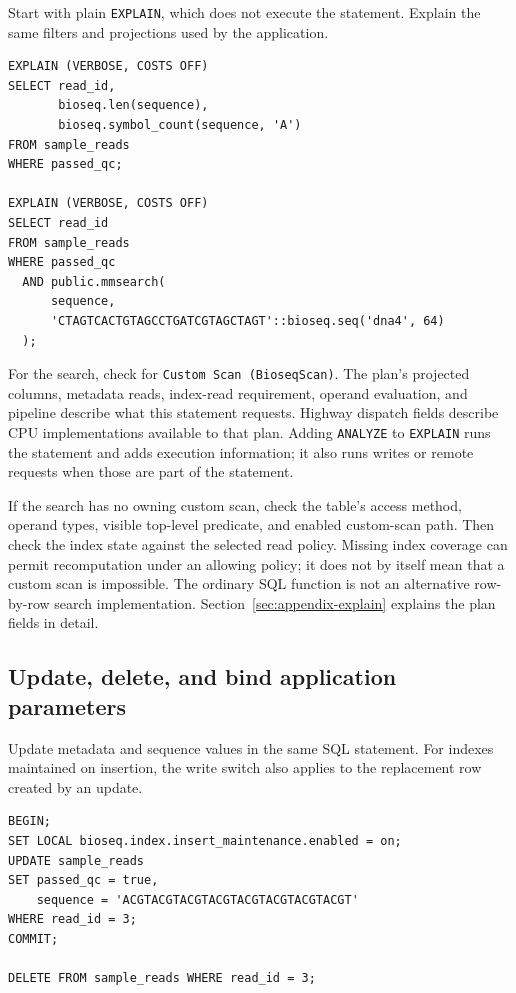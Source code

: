 Start with plain \texttt{EXPLAIN}, which does not execute the statement.
Explain the same filters and projections used by the application.

\par\noindent\begin{minipage}{\linewidth}
\begin{lstlisting}[style=bioseq-appendix-sql]
EXPLAIN (VERBOSE, COSTS OFF)
SELECT read_id,
       bioseq.len(sequence),
       bioseq.symbol_count(sequence, 'A')
FROM sample_reads
WHERE passed_qc;

EXPLAIN (VERBOSE, COSTS OFF)
SELECT read_id
FROM sample_reads
WHERE passed_qc
  AND public.mmsearch(
      sequence,
      'CTAGTCACTGTAGCCTGATCGTAGCTAGT'::bioseq.seq('dna4', 64)
  );
\end{lstlisting}
\end{minipage}

For the search, check for \texttt{Custom Scan (BioseqScan)}. The plan's
projected columns, metadata reads, index-read requirement, operand evaluation,
and pipeline describe what this statement requests. Highway dispatch fields
describe CPU implementations available to that plan. Adding
\texttt{ANALYZE} to \texttt{EXPLAIN} runs the statement and adds execution
information; it also runs writes or remote requests when those are part of the
statement.

If the search has no owning custom scan, check the table's access method,
operand types, visible top-level predicate, and enabled custom-scan path.
Then check the index state against the selected read policy. Missing index
coverage can permit recomputation under an allowing policy; it does not by
itself mean that a custom scan is impossible. The ordinary SQL function is
not an alternative row-by-row search implementation.
Section~\ref{sec:appendix-explain} explains the plan fields in detail.

\subsection{Update, delete, and bind application parameters}

Update metadata and sequence values in the same SQL statement. For indexes
maintained on insertion, the write switch also applies to the replacement
row created by an update.

\par\noindent\begin{minipage}{\linewidth}
\begin{lstlisting}[style=bioseq-appendix-sql]
BEGIN;
SET LOCAL bioseq.index.insert_maintenance.enabled = on;
UPDATE sample_reads
SET passed_qc = true,
    sequence = 'ACGTACGTACGTACGTACGTACGTACGTACGT'
WHERE read_id = 3;
COMMIT;

DELETE FROM sample_reads WHERE read_id = 3;
\end{lstlisting}
\end{minipage}

